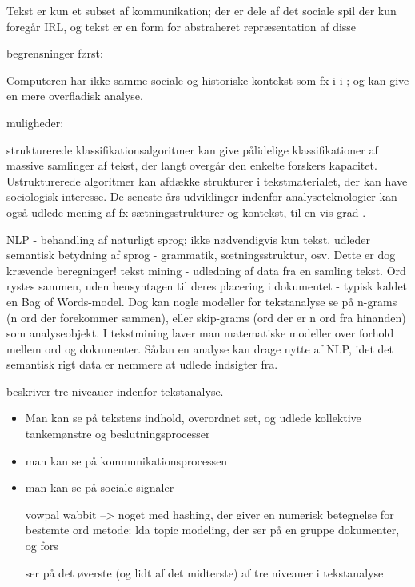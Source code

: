 {Tekst er kun et subset af kommunikation; der er dele af det sociale spil der kun foregår IRL, og tekst er en form for abstraheret repræsentation af disse \autocite[s. 22]{evansMachineTranslationMining2016}

begrensninger først:

Computeren har ikke samme sociale og historiske kontekst som fx i \citeauthor{juulDiskurserOmUngdom2013} i ; og kan give en mere overfladisk analyse.

muligheder:

strukturerede klassifikationsalgoritmer kan give pålidelige klassifikationer af massive samlinger af tekst, der langt overgår den enkelte forskers kapacitet.
Ustrukturerede algoritmer kan afdække strukturer i tekstmaterialet, der kan have sociologisk interesse.
De seneste års udviklinger indenfor analyseteknologier kan også udlede mening af fx sætningsstrukturer og kontekst, til en vis grad \autocite[s. 22]{evansMachineTranslationMining2016}.

NLP - behandling af naturligt sprog;  ikke nødvendigvis kun tekst. udleder semantisk betydning af sprog - grammatik, sœtningsstruktur, osv. Dette er dog krævende beregninger!
tekst mining - udledning af data fra en samling tekst. Ord rystes sammen, uden hensyntagen til deres placering i dokumentet - typisk kaldet en Bag of Words-model. Dog kan nogle modeller for tekstanalyse se på n-grams (n ord der forekommer sammen), eller skip-grams (ord der er n ord fra hinanden) som analyseobjekt. 
I tekstmining laver man matematiske modeller over forhold mellem ord og dokumenter.
Sådan en analyse kan drage nytte af NLP, idet det semantisk rigt data er nemmere at udlede indsigter fra.

\citeauthor{evansMachineTranslationMining2016} beskriver tre niveauer indenfor tekstanalyse.
\begin{itemize}
  \item
    Man kan se på tekstens indhold, overordnet set, og udlede kollektive tankemønstre og beslutningsprocesser
  \item
    man kan se på kommunikationsprocessen
  \item
    man kan se på sociale signaler


vowpal wabbit --> noget med hashing, der giver en numerisk betegnelse for bestemte ord
metode: lda topic modeling, der ser på en gruppe dokumenter, og fors

ser på det øverste (og lidt af det midterste) af tre niveauer i tekstanalyse \autocite{evansMachineTranslationMining2016}


\end{itemize}}
